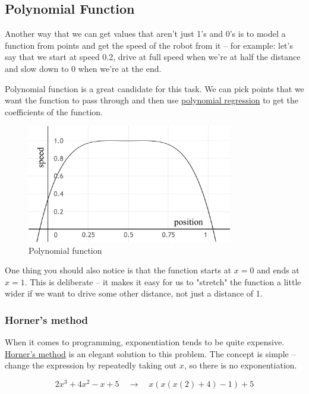 \documentclass[12pt,twoside]{article}
\begin{document}
\subsection{Polynomial Function}
Another way that we can get values that aren't just 1's and 0's is to model a function from points and get the speed of the robot from it -- for example: let's say that we start at speed 0.2, drive at full speed when we're at half the distance and slow down to 0 when we're at the end.

Polynomial function is a great candidate for this task. We can pick points that we want the function to pass through and then use \href{https://en.wikipedia.org/wiki/Polynomial_regression}{polynomial regression} to get the coefficients of the function.

\begin{figure}[H]
\centering
\includegraphics[width=0.8\textwidth]{../assets/images/motor-controllers/polynomial-function.png}
\caption{Polynomial function}
\end{figure}

One thing you should also notice is that the function starts at $x = 0$ and ends at $x = 1$. This is deliberate -- it makes it easy for us to "stretch" the function a little wider if we want to drive some other distance, not just a distance of 1.


\subsubsection{Horner's method}
When it comes to programming, exponentiation tends to be quite expensive. \href{https://en.wikipedia.org/wiki/Horner\%27s_method}{Horner's method} is an elegant solution to this problem. The concept is simple -- change the expression by repeatedly taking out $x$, so there is no exponentiation.

\vspace{-\parskip}\[2x^3 + 4x^2 -x + 5 \quad \rightarrow \quad x(x(x(2) + 4) - 1) + 5\]
\end{document}
